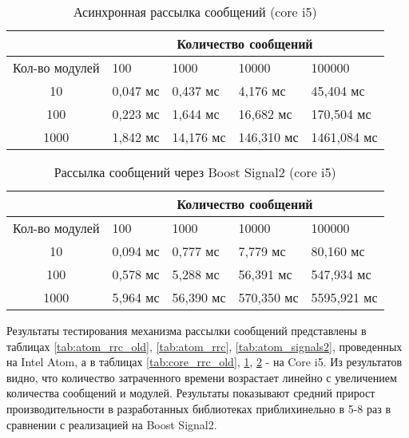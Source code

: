\begin{table}[!htbp]
    \caption{\label{tab:core_rrc}Асинхронная рассылка сообщений (core i5)}
    \begin{center}
        \begin{tabularx}{\textwidth}{|c|X|X|X|X|}
            \hline
            & \multicolumn{4}{|c|}{Количество сообщений} \\
            \hline
            Кол-во модулей & 100   & 1000   & 10000   & 100000   \\
            \hline
            10             & 0,047 мс  & 0,437 мс   & 4,176 мс   
            & 45,404 мс   \\
            \hline
            100            & 0,223 мс  & 1,644 мс  & 16,682 мс  
            & 170,504 мс  \\
            \hline
            1000           & 1,842 мс & 14,176 мс & 146,310 мс & 
            1461,084 мс \\
            \hline
        \end{tabularx}
    \end{center}
\end{table}

\begin{table}[!htbp]
    \caption{\label{tab:core_signals2}Рассылка сообщений через Boost Signal2 (core i5)}
    \begin{center}
        \begin{tabularx}{\textwidth}{|c|X|X|X|X|}
            \hline
            & \multicolumn{4}{|c|}{Количество сообщений} \\
            \hline
            Кол-во модулей & 100   & 1000   & 10000   & 100000   \\
            \hline
            10             & 0,094 мс  & 0,777 мс   & 7,779 мс   
            & 80,160 мс   \\
            \hline
            100            & 0,578 мс  & 5,288 мс  & 56,391 мс  
            & 547,934 мс  \\
            \hline
            1000           & 5,964 мс & 56,390 мс & 570,350 мс & 
            5595,921 мс \\
            \hline
        \end{tabularx}
    \end{center}
\end{table}

Результаты тестирования механизма рассылки сообщений 
представлены в таблицах \ref{tab:atom_rrc_old}, 
\ref{tab:atom_rrc}, \ref{tab:atom_signals2}, проведенных на 
Intel Atom, а в таблицах \ref{tab:core_rrc_old}, 
\ref{tab:core_rrc}, \ref{tab:core_signals2} - на Core i5. Из 
результатов видно, что количество затраченного времени 
возрастает линейно с увеличением количества сообщений и модулей. 
Результаты показывают средний прирост производительности в 
разработанных библиотеках приблихинельно в 5-8 раз в сравнении с 
реализацией на Boost Signal2.


